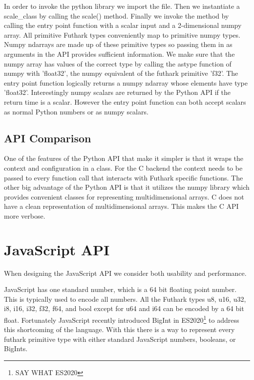 \documentclass[11pt]{book}
\begin{document}
In order to invoke the python library we import the file. Then we instantiate a scale\_class by calling the scale() method. Finally we invoke the method by calling the entry point function with a scalar input and a 2-dimensional numpy array. All primitive Futhark types conveniently map to primitive numpy types. Numpy ndarrays are made up of these primitive types so passing them in as arguments in the API provides sufficient information. We make sure that the numpy array has values of the correct type by calling the astype function of numpy with 'float32', the numpy equivalent of the futhark primitive 'f32'. The entry point function logically returns a numpy ndarray whose elements have type 'float32'. Interestingly numpy scalars are returned by the Python API if the return time is a scalar. However the entry point function can both accept scalars as normal Python numbers or as numpy scalars.


\subsection{API Comparison}

One of the features of the Python API that make it simpler is that it wraps the context and configuration in a class. For the C backend the context needs to be passed to every function call that interacts with Futhark specific functions. The other big advantage of the Python API is that it utilizes the numpy library which provides convenient classes for representing multidimensional arrays. C does not have a clean representation of multidimensional arrays. This makes the C API more verbose.



\section{JavaScript API}

When designing the JavaScript API we consider both usability and performance. 


JavaScript has one standard number, which is a 64 bit floating point number. This is typically used to encode all numbers. All the Futhark types u8, u16, u32, i8, i16, i32, f32, f64, and bool except for u64 and i64 can be encoded by a 64 bit float. Fortunately JavaScript recently introduced BigInt in ES2020\footnote{SAY WHAT ES2020} to address this shortcoming of the language. With this there is a way to represent every futhark primitive type with either standard JavaScript numbers, booleans, or BigInts. 
\end{document}
